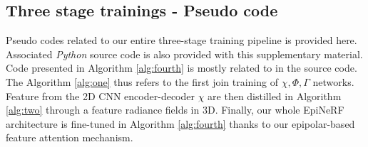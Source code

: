 \subsection{Three stage trainings - Pseudo code}
Pseudo codes related to our entire three-stage training pipeline is provided here. Associated \textit{Python} source code is also provided with this supplementary material. Code presented in Algorithm \ref{alg:fourth} is mostly related to  in the source code. 
The Algorithm \ref{alg:one} thus refers to the first join training of $\chi,\Phi,\Gamma$ networks. Feature from the 2D CNN encoder-decoder $\chi$ are then distilled in Algorithm \ref{alg:two} through a feature radiance fields in 3D. Finally, our whole EpiNeRF architecture is fine-tuned in Algorithm \ref{alg:fourth} thanks to our epipolar-based feature attention mechanism. 

